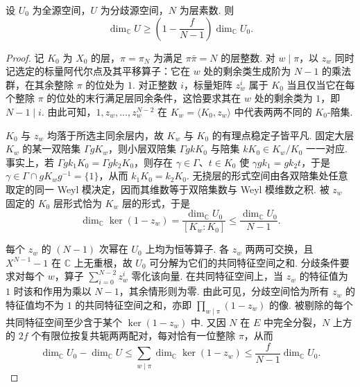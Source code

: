 \begin{lemma}[分歧源空间的维数]
\label{lem:a-ramified-dimension}
\emitthmsource
设 $U_0$ 为全源空间，$U$ 为分歧源空间，$N$ 为层素数. 则
\[
 \dim_{\mathbb C}U\ge
 \left(1-\frac{f}{N-1}\right)\dim_{\mathbb C}U_0 .
\]
\end{lemma}
\begin{proof}
记 $K_0$ 为 $X_0$ 的层，$\pi=\pi_N$ 为满足 $\pi\bar\pi=N$ 的层整数. 对 $w\mid\pi$，以 $z_w$ 同时记选定的标量阿代尔点及其平移算子：它在 $w$ 处的剩余类生成阶为 $N-1$ 的乘法群，在其余整除 $\pi$ 的位处为 $1$. 对正整数 $i$，标量矩阵 $z_w^i$ 属于 $K_0$ 当且仅当它在每个整除 $\pi$ 的位处的末行满足层同余条件，这恰要求其在 $w$ 处的剩余类为 $1$，即 $N-1\mid i$. 由此可知，$1,z_w,\dots,z_w^{N-2}$ 在 $K_w=\langle K_0,z_w\rangle$ 中代表两两不同的 $K_0$-陪集.

$K_0$ 与 $z_w$ 均落于所选主同余层内，故 $K_w$ 与 $K_0$ 的有理点稳定子皆平凡. 固定大层 $K_w$ 的某一双陪集 $\Gamma gK_w$，则小层双陪集 $\Gamma gkK_0$ 与陪集 $kK_0\in K_w/K_0$ 一一对应. 事实上，若 $\Gamma gk_1K_0=\Gamma gk_2K_0$，则存在 $\gamma\in\Gamma$、$t\in K_0$ 使 $\gamma gk_1=gk_2t$，于是 $\gamma\in\Gamma\cap gK_wg^{-1}=\{1\}$，从而 $k_1K_0=k_2K_0$. 无挠层的形式空间由各双陪集处任意取定的同一 Weyl 模决定，因而其维数等于双陪集数与 Weyl 模维数之积. 被 $z_w$ 固定的 $K_0$ 层形式恰为 $K_w$ 层的形式，于是
\[
 \dim_{\mathbb C}\ker(1-z_w)
 =\frac{\dim_{\mathbb C}U_0}{[K_w:K_0]}
 \le \frac{\dim_{\mathbb C}U_0}{N-1}.
\]

每个 $z_w$ 的 $(N-1)$ 次幂在 $U_0$ 上均为恒等算子. 各 $z_w$ 两两可交换，且 $X^{N-1}-1$ 在 $\mathbb C$ 上无重根，故 $U_0$ 可分解为它们的共同特征空间之和. 分歧条件要求对每个 $w$，算子 $\sum_{i=0}^{N-2}z_w^i$ 零化该向量. 在共同特征空间上，当 $z_w$ 的特征值为 $1$ 时该和作用为乘以 $N-1$，其余情形则为零. 由此可见，分歧空间恰为所有 $z_w$ 的特征值均不为 $1$ 的共同特征空间之和，亦即 $\prod_{w\mid\pi}(1-z_w)$ 的像. 被剔除的每个共同特征空间至少含于某个 $\ker(1-z_w)$ 中. 又因 $N$ 在 $E$ 中完全分裂，$N$ 上方的 $2f$ 个有限位按复共轭两两配对，每对恰有一位整除 $\pi$，从而
\[
 \dim_{\mathbb C}U_0-\dim_{\mathbb C}U
 \le \sum_{w\mid\pi}\dim_{\mathbb C}\ker(1-z_w)
 \le \frac{f}{N-1}\dim_{\mathbb C}U_0 .
\]
\end{proof}

